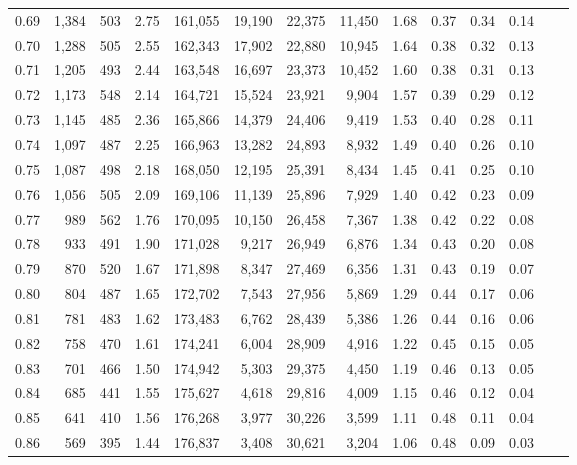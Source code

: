 \begin{tabular}{rrrrrrrrrrrrrr}
0.69 &  1,384 &  503 &    2.75 &  161,055 &   19,190 &  22,375 &  11,450 &  1.68 &  0.37 &  0.34 &      0.14 \\
0.70 &  1,288 &  505 &    2.55 &  162,343 &   17,902 &  22,880 &  10,945 &  1.64 &  0.38 &  0.32 &      0.13 \\
0.71 &  1,205 &  493 &    2.44 &  163,548 &   16,697 &  23,373 &  10,452 &  1.60 &  0.38 &  0.31 &      0.13 \\
0.72 &  1,173 &  548 &    2.14 &  164,721 &   15,524 &  23,921 &   9,904 &  1.57 &  0.39 &  0.29 &      0.12 \\
0.73 &  1,145 &  485 &    2.36 &  165,866 &   14,379 &  24,406 &   9,419 &  1.53 &  0.40 &  0.28 &      0.11 \\
0.74 &  1,097 &  487 &    2.25 &  166,963 &   13,282 &  24,893 &   8,932 &  1.49 &  0.40 &  0.26 &      0.10 \\
0.75 &  1,087 &  498 &    2.18 &  168,050 &   12,195 &  25,391 &   8,434 &  1.45 &  0.41 &  0.25 &      0.10 \\
0.76 &  1,056 &  505 &    2.09 &  169,106 &   11,139 &  25,896 &   7,929 &  1.40 &  0.42 &  0.23 &      0.09 \\
0.77 &    989 &  562 &    1.76 &  170,095 &   10,150 &  26,458 &   7,367 &  1.38 &  0.42 &  0.22 &      0.08 \\
0.78 &    933 &  491 &    1.90 &  171,028 &    9,217 &  26,949 &   6,876 &  1.34 &  0.43 &  0.20 &      0.08 \\
0.79 &    870 &  520 &    1.67 &  171,898 &    8,347 &  27,469 &   6,356 &  1.31 &  0.43 &  0.19 &      0.07 \\
0.80 &    804 &  487 &    1.65 &  172,702 &    7,543 &  27,956 &   5,869 &  1.29 &  0.44 &  0.17 &      0.06 \\
0.81 &    781 &  483 &    1.62 &  173,483 &    6,762 &  28,439 &   5,386 &  1.26 &  0.44 &  0.16 &      0.06 \\
0.82 &    758 &  470 &    1.61 &  174,241 &    6,004 &  28,909 &   4,916 &  1.22 &  0.45 &  0.15 &      0.05 \\
0.83 &    701 &  466 &    1.50 &  174,942 &    5,303 &  29,375 &   4,450 &  1.19 &  0.46 &  0.13 &      0.05 \\
0.84 &    685 &  441 &    1.55 &  175,627 &    4,618 &  29,816 &   4,009 &  1.15 &  0.46 &  0.12 &      0.04 \\
0.85 &    641 &  410 &    1.56 &  176,268 &    3,977 &  30,226 &   3,599 &  1.11 &  0.48 &  0.11 &      0.04 \\
0.86 &    569 &  395 &    1.44 &  176,837 &    3,408 &  30,621 &   3,204 &  1.06 &  0.48 &  0.09 &      0.03 \\

\end{tabular}
